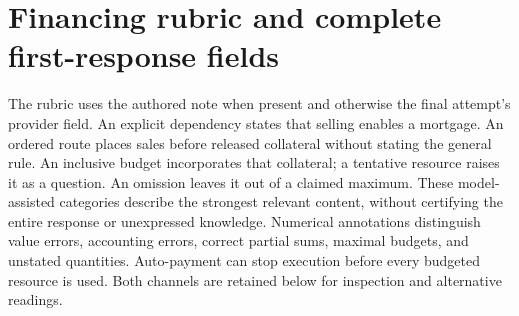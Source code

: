 \section{Financing rubric and complete first-response fields}
\label{app:channels}

The rubric uses the authored note when present and otherwise the final attempt's provider field. An explicit dependency states that selling enables a mortgage. An ordered route places sales before released collateral without stating the general rule. An inclusive budget incorporates that collateral; a tentative resource raises it as a question. An omission leaves it out of a claimed maximum. These model-assisted categories describe the strongest relevant content, without certifying the entire response or unexpressed knowledge. Numerical annotations distinguish value errors, accounting errors, correct partial sums, maximal budgets, and unstated quantities. Auto-payment can stop execution before every budgeted resource is used. Both channels are retained below for inspection and alternative readings.

